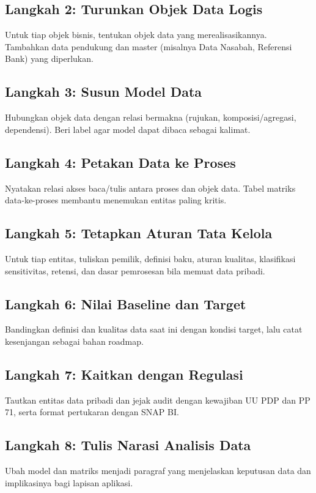 \subsection{Langkah 2: Turunkan Objek Data Logis}
Untuk tiap objek bisnis, tentukan objek data yang merealisasikannya. Tambahkan
data pendukung dan master (misalnya Data Nasabah, Referensi Bank) yang diperlukan.

\subsection{Langkah 3: Susun Model Data}
Hubungkan objek data dengan relasi bermakna (rujukan, komposisi/agregasi,
dependensi). Beri label agar model dapat dibaca sebagai kalimat.

\subsection{Langkah 4: Petakan Data ke Proses}
Nyatakan relasi akses baca/tulis antara proses dan objek data. Tabel matriks
data-ke-proses membantu menemukan entitas paling kritis.

\subsection{Langkah 5: Tetapkan Aturan Tata Kelola}
Untuk tiap entitas, tuliskan pemilik, definisi baku, aturan kualitas, klasifikasi
sensitivitas, retensi, dan dasar pemrosesan bila memuat data pribadi.

\subsection{Langkah 6: Nilai Baseline dan Target}
Bandingkan definisi dan kualitas data saat ini dengan kondisi target, lalu catat
kesenjangan sebagai bahan roadmap.

\subsection{Langkah 7: Kaitkan dengan Regulasi}
Tautkan entitas data pribadi dan jejak audit dengan kewajiban UU PDP dan PP 71,
serta format pertukaran dengan SNAP BI.

\subsection{Langkah 8: Tulis Narasi Analisis Data}
Ubah model dan matriks menjadi paragraf yang menjelaskan keputusan data dan
implikasinya bagi lapisan aplikasi.

